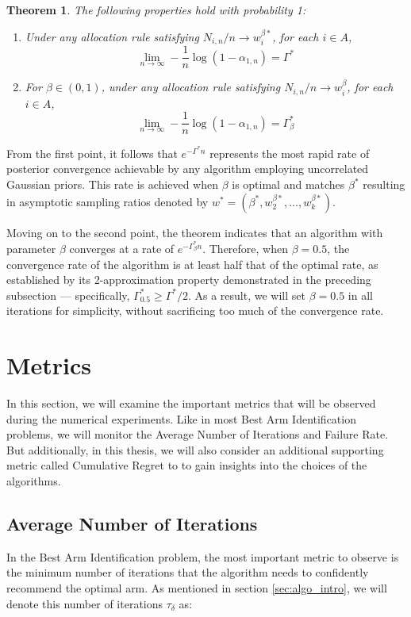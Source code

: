 \documentclass[a4paper, 12pt]{article}
\newtheorem{theorem}{Theorem}[section]
\theoremstyle{definition}
\begin{document}
\begin{theorem}
The following properties hold with probability 1:

\begin{enumerate}
\item Under any allocation rule satisfying $N_{i,n}/n \to w_i^{\beta*}$, for each $i \in A$,
\[
\lim_{n\to\infty} -\frac{1}{n}\log(1-\alpha_{1,n}) = \Gamma^*
\]

\item For $\beta\in (0,1)$, under any allocation rule satisfying $N_{i,n}/n \to w_i^\beta$, for each $i \in A$,
\[
\lim_{n\to\infty} -\frac{1}{n}\log(1-\alpha_{1,n}) = \Gamma_\beta^*
\]
\end{enumerate}
\end{theorem}

From the first point, it follows that $e^{-\Gamma^*n}$ represents the most rapid rate of posterior convergence achievable by any algorithm employing uncorrelated Gaussian priors. This rate is achieved when $\beta$ is optimal and matches $\beta^*$ resulting in asymptotic sampling ratios denoted by $w^* = \left(\beta^*, w_2^{\beta*}, ..., w_k^{\beta*}\right)$. 

Moving on to the second point, the theorem indicates that an algorithm with parameter $\beta$ converges at a rate of $e^{-\Gamma_\beta^*n}$. Therefore, when $\beta = 0.5$, the convergence rate of the algorithm is at least half that of the optimal rate, as established by its 2-approximation property demonstrated in the preceding subsection — specifically, $\Gamma_{0.5}^* \geq \Gamma^*/2$. As a result, we will set $\beta = 0.5$ in all iterations for simplicity, without sacrificing too much of the convergence rate.



\section{Metrics} \label{sec:metrics}
In this section, we will examine the important metrics that will be observed during the numerical experiments. Like in most Best Arm Identification problems, we will monitor the Average Number of Iterations and Failure Rate. But additionally, in this thesis, we will also consider an additional supporting metric called Cumulative Regret to to gain insights into the choices of the algorithms.


\subsection{Average Number of Iterations}
In the Best Arm Identification problem, the most important metric to observe is the minimum number of iterations that the algorithm needs to confidently recommend the optimal arm. As mentioned in section \ref{sec:algo_intro}, we will denote this number of iterations $\tau_\delta$ as:
\end{document}
